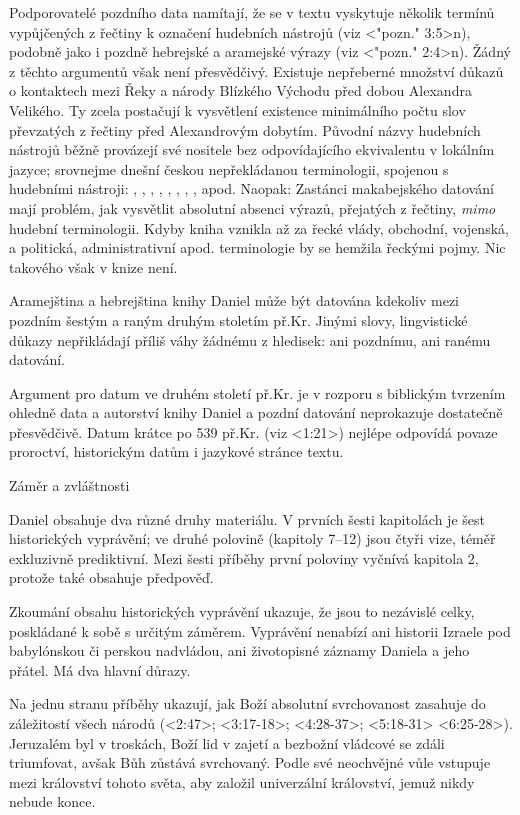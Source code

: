 Podporovatelé pozdního data namítají, že se v textu vyskytuje několik termínů vypůjčených z řečtiny k označení hudebních nástrojů (viz <"pozn." 3:5>n), podobně jako i  pozdně hebrejské a aramejské výrazy (viz <"pozn." 2:4>n).
Žádný z těchto argumentů však není přesvědčivý.
Existuje nepřeberné množství důkazů o kontaktech mezi Řeky a národy Blízkého Východu před dobou Alexandra Velikého. Ty zcela postačují k vysvětlení existence minimálního počtu slov převzatých z řečtiny před Alexandrovým dobytím. 
Původní názvy hudebních nástrojů běžně provázejí své nositele bez odpovídajícího ekvivalentu v lokálním jazyce; srovnejme dnešní českou nepřekládanou terminologii, spojenou s hudebními nástroji:  , , , , , , , ,  apod.
Naopak: Zastánci makabejského datování mají problém, jak vysvětlit absolutní absenci výrazů, přejatých z řečtiny, {\it mimo\/} hudební terminologii. Kdyby kniha vznikla až za řecké vlády, obchodní, vojenská, a politická, administrativní apod. terminologie  by se hemžila řeckými pojmy. Nic takového však v knize není.

Aramejština a hebrejština knihy Daniel může být datována kdekoliv mezi pozdním šestým a raným druhým stoletím př.Kr. Jinými slovy, lingvistické důkazy nepřikládají příliš váhy žádnému z hledisek: ani pozdnímu, ani ranému datování.

Argument pro datum ve druhém století př.Kr. je v rozporu s biblickým tvrzením ohledně data a autorství knihy Daniel a pozdní datování neprokazuje dostatečně přesvědčivě.   Datum krátce po 539 př.Kr. (viz <1:21>) nejlépe odpovídá povaze proroctví, historickým datům i jazykové stránce textu.


 Záměr a zvláštnosti
 
 Daniel obsahuje dva různé druhy materiálu.
 V prvních šesti kapitolách je šest historických vyprávění; ve druhé polovině (kapitoly 7--12) jsou čtyři vize, téměř exkluzivně prediktivní. Mezi šesti příběhy první poloviny vyčnívá kapitola 2, protože také obsahuje předpověď. 

Zkoumání obsahu historických vyprávění ukazuje, že jsou to nezávislé celky, poskládané k sobě s určitým záměrem.
Vyprávění nenabízí ani historii Izraele pod babylónskou či perskou nadvládou, ani životopisné záznamy Daniela a jeho přátel. Má dva hlavní důrazy.

Na jednu stranu příběhy ukazují, jak Boží absolutní svrchovanost zasahuje do záležitostí všech národů 
(<2:47>; <3:17-18>; <4:28-37>; <5:18-31> <6:25-28>).
Jeruzalém byl v troskách, Boží lid v zajetí a bezbožní vládcové se zdáli triumfovat, avšak Bůh zůstává svrchovaný.
Podle své neochvějné vůle vstupuje mezi království tohoto světa, aby založil univerzální království, jemuž nikdy nebude konce.

